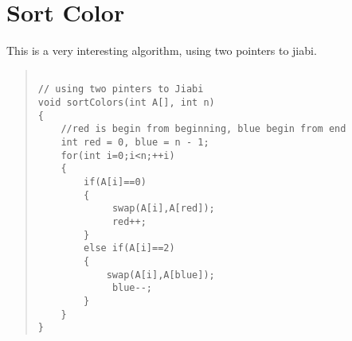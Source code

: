 \section{Sort Color}

This is a very interesting algorithm, using two pointers to jiabi.

\begin{quote}
\begin{verbatim}

// using two pinters to Jiabi
void sortColors(int A[], int n) 
{
	//red is begin from beginning, blue begin from end
	int red = 0, blue = n - 1;
	for(int i=0;i<n;++i)
	{
		if(A[i]==0)
		{
			 swap(A[i],A[red]);
			 red++;
		}
		else if(A[i]==2)
		{
			swap(A[i],A[blue]);
			 blue--;
		}
	}
}

\end{verbatim}
\end{quote}